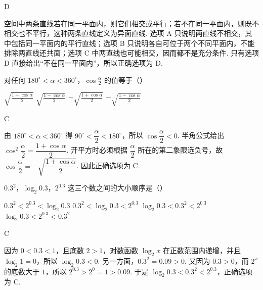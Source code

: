 \begin{answer}
D
\end{answer}

\begin{solution}
空间中两条直线若在同一平面内，则它们相交或平行；若不在同一平面内，则既不相交也不平行，这种两条直线定义为异面直线. 选项 A 只说明两直线不相交，其中包括同一平面内的平行直线；选项 B 只说明各自可位于两个不同平面内，不能排除两直线还共面；选项 C 中两直线也可能相交，因而都不是充分条件. 只有选项 D 直接给出“不在同一平面内”，所以正确选项为 D.
\end{solution}

\begin{problem}
对任何 \(180^{\circ} < \alpha < 360^{\circ}\)，\(\cos \frac{\alpha}{2}\) 的值等于（\quad）

\choices
    {\(\sqrt{\frac{1 + \cos\alpha}{2}}\)}
    {\(\sqrt{\frac{1 - \cos\alpha}{2}}\)}
    {\(-\sqrt{\frac{1 + \cos\alpha}{2}}\)}
    {\(-\sqrt{\frac{1 - \cos\alpha}{2}}\)}
\end{problem}

\begin{answer}
C
\end{answer}

\begin{solution}
由 \(180^{\circ}<\alpha<360^{\circ}\) 得 \(90^{\circ}<\dfrac{\alpha}{2}<180^{\circ}\)，所以 \(\cos\dfrac{\alpha}{2}<0\). 半角公式给出 \(\cos^2\dfrac{\alpha}{2}=\dfrac{1+\cos\alpha}{2}\). 开平方时必须根据 \(\dfrac{\alpha}{2}\) 所在的第二象限选负号，故 \(\cos\dfrac{\alpha}{2}=-\sqrt{\dfrac{1+\cos\alpha}{2}}\). 因此正确选项为 C.
\end{solution}

\begin{problem}
\(0.3^{2}\)，\(\log_{2}0.3\)，\(2^{0.3}\) 这三个数之间的大小顺序是（\quad）

\choices
    {\(0.3^{2} < 2^{0.3} < \log_{2}0.3\)}
    {\(0.3^{2} < \log_{2}0.3 < 2^{0.3}\)}
    {\(\log_{2}0.3 < 0.3^{2} < 2^{0.3}\)}
    {\(\log_{2}0.3 < 2^{0.3} < 0.3^{2}\)}
\end{problem}

\begin{answer}
C
\end{answer}

\begin{solution}
因为 \(0<0.3<1\)，且底数 \(2>1\)，对数函数 \(\log_2 x\) 在正数范围内递增，并且 \(\log_2 1=0\)，所以 \(\log_2 0.3<0\). 另一方面，\(0.3^2=0.09>0\). 又因为 \(0.3>0\)，而 \(2^x\) 的底数大于 \(1\)，所以 \(2^{0.3}>2^0=1>0.09\). 于是 \(\log_2 0.3<0.3^2<2^{0.3}\)，正确选项为 C.
\end{solution}

